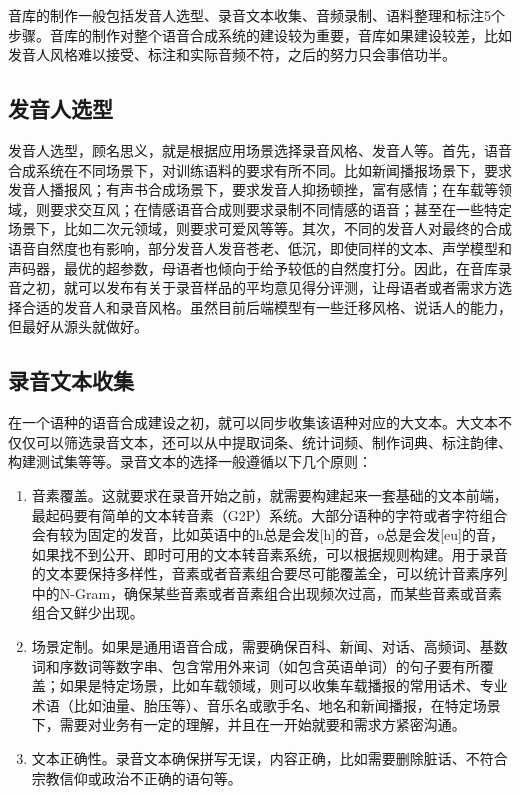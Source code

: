 \documentclass[cn,10pt,math=newtx,citestyle=gb7714-2015,bibstyle=gb7714-2015]{elegantbook}
\begin{document}
音库的制作一般包括发音人选型、录音文本收集、音频录制、语料整理和标注5个步骤。音库的制作对整个语音合成系统的建设较为重要，音库如果建设较差，比如发音人风格难以接受、标注和实际音频不符，之后的努力只会事倍功半。

\subsection{发音人选型}

发音人选型，顾名思义，就是根据应用场景选择录音风格、发音人等。首先，语音合成系统在不同场景下，对训练语料的要求有所不同。比如新闻播报场景下，要求发音人播报风；有声书合成场景下，要求发音人抑扬顿挫，富有感情；在车载等领域，则要求交互风；在情感语音合成则要求录制不同情感的语音；甚至在一些特定场景下，比如二次元领域，则要求可爱风等等。其次，不同的发音人对最终的合成语音自然度也有影响，部分发音人发音苍老、低沉，即使同样的文本、声学模型和声码器，最优的超参数，母语者也倾向于给予较低的自然度打分。因此，在音库录音之初，就可以发布有关于录音样品的平均意见得分评测，让母语者或者需求方选择合适的发音人和录音风格。虽然目前后端模型有一些迁移风格、说话人的能力，但最好从源头就做好。

\subsection{录音文本收集}

在一个语种的语音合成建设之初，就可以同步收集该语种对应的大文本。大文本不仅仅可以筛选录音文本，还可以从中提取词条、统计词频、制作词典、标注韵律、构建测试集等等。录音文本的选择一般遵循以下几个原则：

\begin{enumerate}
  \item 音素覆盖。这就要求在录音开始之前，就需要构建起来一套基础的文本前端，最起码要有简单的文本转音素（G2P）系统。大部分语种的字符或者字符组合会有较为固定的发音，比如英语中的h总是会发[h]的音，o总是会发[eu]的音，如果找不到公开、即时可用的文本转音素系统，可以根据规则构建。用于录音的文本要保持多样性，音素或者音素组合要尽可能覆盖全，可以统计音素序列中的N-Gram，确保某些音素或者音素组合出现频次过高，而某些音素或音素组合又鲜少出现。
  \item 场景定制。如果是通用语音合成，需要确保百科、新闻、对话、高频词、基数词和序数词等数字串、包含常用外来词（如包含英语单词）的句子要有所覆盖；如果是特定场景，比如车载领域，则可以收集车载播报的常用话术、专业术语（比如油量、胎压等）、音乐名或歌手名、地名和新闻播报，在特定场景下，需要对业务有一定的理解，并且在一开始就要和需求方紧密沟通。
  \item 文本正确性。录音文本确保拼写无误，内容正确，比如需要删除脏话、不符合宗教信仰或政治不正确的语句等。
\end{enumerate}
\end{document}
